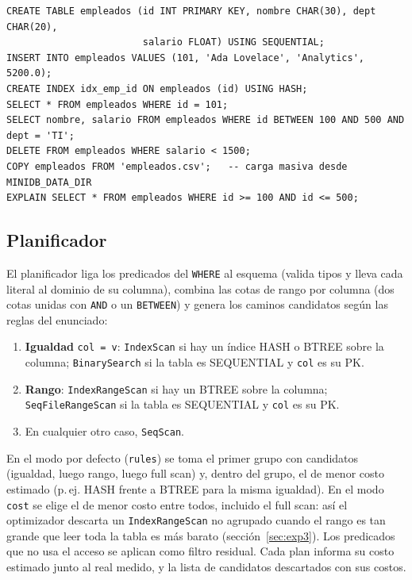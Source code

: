\documentclass[11pt,a4paper]{article}
\newcommand{\code}[1]{\texttt{#1}}
\begin{document}
\begin{lstlisting}[style=sql]
CREATE TABLE empleados (id INT PRIMARY KEY, nombre CHAR(30), dept CHAR(20),
                        salario FLOAT) USING SEQUENTIAL;
INSERT INTO empleados VALUES (101, 'Ada Lovelace', 'Analytics', 5200.0);
CREATE INDEX idx_emp_id ON empleados (id) USING HASH;
SELECT * FROM empleados WHERE id = 101;
SELECT nombre, salario FROM empleados WHERE id BETWEEN 100 AND 500 AND dept = 'TI';
DELETE FROM empleados WHERE salario < 1500;
COPY empleados FROM 'empleados.csv';   -- carga masiva desde MINIDB_DATA_DIR
EXPLAIN SELECT * FROM empleados WHERE id >= 100 AND id <= 500;
\end{lstlisting}

\subsection{Planificador}

El planificador liga los predicados del \code{WHERE} al esquema (valida tipos y lleva cada literal
al dominio de su columna), combina las cotas de rango por columna (dos cotas unidas con \code{AND} o
un \code{BETWEEN}) y genera los caminos candidatos según las reglas del enunciado:

\begin{enumerate}
\item \textbf{Igualdad} \code{col = v}: \code{IndexScan} si hay un índice HASH o BTREE sobre la columna;
  \code{BinarySearch} si la tabla es SEQUENTIAL y \code{col} es su PK.
\item \textbf{Rango}: \code{IndexRangeScan} si hay un BTREE sobre la columna; \code{SeqFileRangeScan}
  si la tabla es SEQUENTIAL y \code{col} es su PK.
\item En cualquier otro caso, \code{SeqScan}.
\end{enumerate}

En el modo por defecto (\code{rules}) se toma el primer grupo con candidatos (igualdad, luego rango,
luego full scan) y, dentro del grupo, el de menor costo estimado (p.\,ej. HASH frente a BTREE para la
misma igualdad). En el modo \code{cost} se elige el de menor costo entre todos, incluido el full scan:
así el optimizador descarta un \code{IndexRangeScan} no agrupado cuando el rango es tan grande que
leer toda la tabla es más barato (sección~\ref{sec:exp3}). Los predicados que no usa el acceso se
aplican como filtro residual. Cada plan informa su costo estimado junto al real medido, y la lista de
candidatos descartados con sus costos.
\end{document}
